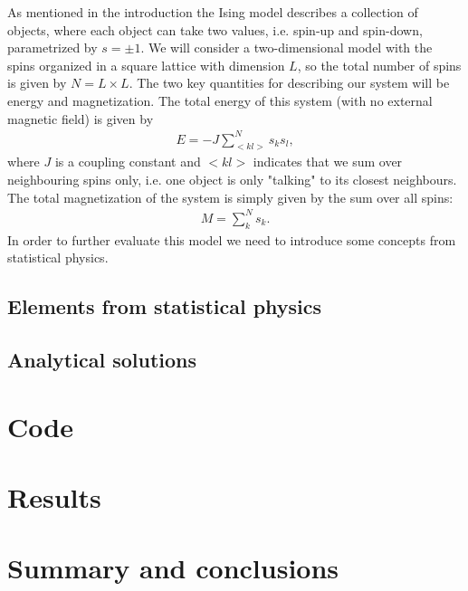 \documentclass[12pt, a4paper]{article}
\begin{document}
As mentioned in the introduction the Ising model describes a collection of objects, where each object 
can take two values, i.e. spin-up and spin-down, parametrized by $s=\pm 1$. We will consider a 
two-dimensional model with the spins organized in a square lattice with dimension $L$, so the total 
number of spins is given by $N = L\times L$. The two key quantities for describing our system 
will be energy and magnetization. The total energy of this system (with no external magnetic field) 
is given by 
\begin{align}
E = -J\sum_{<kl>}^{N} s_k s_l, 
\end{align}
where $J$ is a coupling constant and $<kl>$ indicates that we sum over neighbouring spins only, i.e. 
one object is only "talking" to its closest neighbours. The total magnetization of the system is simply 
given by the sum over all spins: 
\begin{align} 
M = \sum_k^N s_k. 
\end{align}
In order to further evaluate this model we need to introduce some concepts from statistical physics. 

\subsection{Elements from statistical physics}



\subsection{Analytical solutions}

\section{Code}

\section{Results}

\section{Summary and conclusions}
\end{document}
